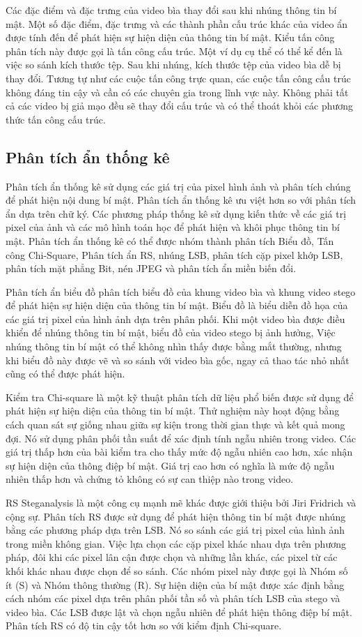 Các đặc điểm và đặc trưng của video bìa thay đổi sau khi nhúng thông tin bí mật. Một số đặc điểm, đặc trưng và các thành phần cấu trúc khác của video ẩn được tính đến để phát hiện sự hiện diện của thông tin bí mật. Kiểu tấn công phân tích này được gọi là tấn công cấu trúc. Một ví dụ cụ thể có thể kể đến là việc so sánh kích thước tệp. Sau khi nhúng, kích thước tệp của video bìa dễ bị thay đổi. Tương tự như các cuộc tấn công trực quan, các cuộc tấn công cấu trúc không đáng tin cậy và cần có các chuyên gia trong lĩnh vực này. Không phải tất cả các video bị giả mạo đều sẽ thay đổi cấu trúc và có thể thoát khỏi các phương thức tấn công cấu trúc.

\subsection{Phân tích ẩn thống kê}
Phân tích ẩn thống kê sử dụng các giá trị của pixel hình ảnh và phân tích chúng để phát hiện nội dung bí mật. Phân tích ẩn thống kê ưu việt hơn so với phân tích ẩn dựa trên chữ ký. Các phương pháp thống kê sử dụng kiến thức về các giá trị pixel của ảnh và các mô hình toán học để phát hiện và khôi phục thông tin bí mật. Phân tích ẩn thống kê có thể được nhóm thành phân tích Biểu đồ, Tấn công Chi-Square, Phân tích ẩn RS, nhúng LSB, phân tích cặp pixel khớp LSB, phân tích mặt phẳng Bit, nén JPEG và phân tích ẩn miền biến đổi.

Phân tích ẩn biểu đồ phân tích biểu đồ của khung video bìa và khung video stego để phát hiện sự hiện diện của thông tin bí mật. Biểu đồ là biểu diễn đồ họa của các giá trị pixel của hình ảnh dựa trên phân phối. Khi một video bìa được điều khiển để nhúng thông tin bí mật, biểu đồ của video stego bị ảnh hưởng, Việc nhúng thông tin bí mật có thể không nhìn thấy được bằng mắt thường, nhưng khi biểu đồ này được vẽ và so sánh với video bìa gốc, ngay cả thao tác nhỏ nhất cũng có thể được phát hiện.

Kiểm tra Chi-square là một kỹ thuật phân tích dữ liệu phổ biến được sử dụng để phát hiện sự hiện diện của thông tin bí mật. Thử nghiệm này hoạt động bằng cách quan sát sự giống nhau giữa sự kiện trong thời gian thực và kết quả mong đợi. Nó sử dụng phân phối tần suất để xác định tính ngẫu nhiên trong video. Các giá trị thấp hơn của bài kiểm tra cho thấy mức độ ngẫu nhiên cao hơn, xác nhận sự hiện diện của thông điệp bí mật. Giá trị cao hơn có nghĩa là mức độ ngẫu nhiên thấp hơn và chứng tỏ không có sự can thiệp nào trong video.

RS Steganalysis là một công cụ mạnh mẽ khác được giới thiệu bởi Jiri Fridrich và cộng sự. Phân tích RS được sử dụng để phát hiện thông tin bí mật được nhúng bằng các phương pháp dựa trên LSB. Nó so sánh các giá trị pixel của hình ảnh trong miền không gian. Việc lựa chọn các cặp pixel khác nhau dựa trên phương pháp, đôi khi các pixel lân cận được chọn và những lần khác, các pixel từ các khối khác nhau được chọn để so sánh. Các nhóm pixel này được gọi là Nhóm số ít (S) và Nhóm thông thường (R). Sự hiện diện của bí mật được xác định bằng cách nhóm các pixel dựa trên phân phối tần số và phân tích LSB của stego và video bìa. Các LSB được lật và chọn ngẫu nhiên để phát hiện thông điệp bí mật. Phân tích RS có độ tin cậy tốt hơn so với kiểm định Chi-square.

